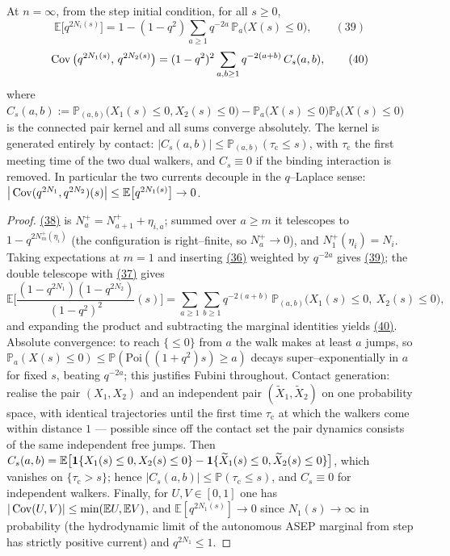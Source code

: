 \documentclass[11pt]{article}
\theoremstyle{plain}
\theoremstyle{definition}
\theoremstyle{remark}
\newcommand{\E}{\mathbb{E}}\newcommand{\PP}{\mathbb{P}}\newcommand{\dd}{\,\mathrm{d}}
\begin{document}
At $n=\infty$, from the step initial condition, for all $s\ge0$,
\label{eq_qmom}
\begin{equation}
  \E\big[q^{2N_i(s)}\big]=1-(1-q^2)\sum_{a\ge1}q^{-2a}\,\PP_a\big(X(s)\le0\big),\qquad(39)
\end{equation}
\label{eq_qcov}
\begin{equation}
  \operatorname{Cov}\big(q^{2N_1(s)},\,q^{2N_2(s)}\big)
  =(1-q^2)^2\sum_{a,b\ge1}q^{-2(a+b)}\,C_s(a,b),\qquad(40)
\end{equation}
where
$C_s(a,b):=\PP_{(a,b)}\big(X_1(s)\le0,X_2(s)\le0\big)
-\PP_a\big(X(s)\le0\big)\PP_b\big(X(s)\le0\big)$ is the connected pair kernel and all
sums converge absolutely. The kernel is generated entirely by contact:
$|C_s(a,b)|\le\PP_{(a,b)}(\tau_{\mathrm c}\le s)$, with $\tau_{\mathrm c}$ the first
meeting time of the two dual walkers, and $C_s\equiv0$ if the binding interaction is
removed. In particular the two currents decouple in the $q$--Laplace sense:
$\big|\Cov(q^{2N_1},q^{2N_2})(s)\big|\le\E\big[q^{2N_1(s)}\big]\to0$.
\par
\begin{proof}
\hyperref[eq_telescope]{(38)} is $N^+_a=N^+_{a+1}+\eta_{i,a}$; summed over $a\ge m$ it
telescopes to $1-q^{2N^+_m(\eta_i)}$ (the configuration is right--finite, so
$N^+_a\to0$), and $N^+_1(\eta_i)=N_i$. Taking expectations at $m=1$ and inserting
\hyperref[eq_tri1]{(36)} weighted by $q^{-2a}$ gives \hyperref[eq_qmom]{(39)}; the double telescope
with \hyperref[eq_tri2]{(37)} gives
\[
  \E\Big[\frac{(1-q^{2N_1})(1-q^{2N_2})}{(1-q^2)^2}(s)\Big]
  =\sum_{a\ge1}\sum_{b\ge1}q^{-2(a+b)}\,\PP_{(a,b)}\big(X_1(s)\le0,\ X_2(s)\le0\big),
\]
and expanding the product and subtracting the marginal identities yields
\hyperref[eq_qcov]{(40)}. Absolute convergence: to reach $\{\le0\}$ from $a$ the walk makes at
least $a$ jumps, so $\PP_a(X(s)\le0)\le\PP(\mathrm{Poi}((1+q^2)s)\ge a)$ decays
super--exponentially in $a$ for fixed $s$, beating $q^{-2a}$; this justifies Fubini
throughout. Contact generation: realise the pair $(X_1,X_2)$ and an independent pair
$(\widetilde X_1,\widetilde X_2)$ on one probability space, with identical
trajectories until the first time $\tau_{\mathrm c}$ at which the walkers come within
distance $1$ --- possible since off the contact set the pair dynamics consists of the
same independent free jumps. Then
$C_s(a,b)=\E\big[\bone\{X_1(s)\le0,X_2(s)\le0\}
-\bone\{\widetilde X_1(s)\le0,\widetilde X_2(s)\le0\}\big]$, which vanishes on
$\{\tau_{\mathrm c}>s\}$; hence $|C_s(a,b)|\le\PP(\tau_{\mathrm c}\le s)$, and
$C_s\equiv0$ for independent walkers. Finally, for $U,V\in[0,1]$ one has
$|\Cov(U,V)|\le\min(\E U,\E V)$, and $\E[q^{2N_1(s)}]\to0$ since $N_1(s)\to\infty$
in probability (the hydrodynamic limit of the autonomous ASEP marginal from step has
strictly positive current) and $q^{2N_1}\le1$.
\end{proof}
\end{document}
